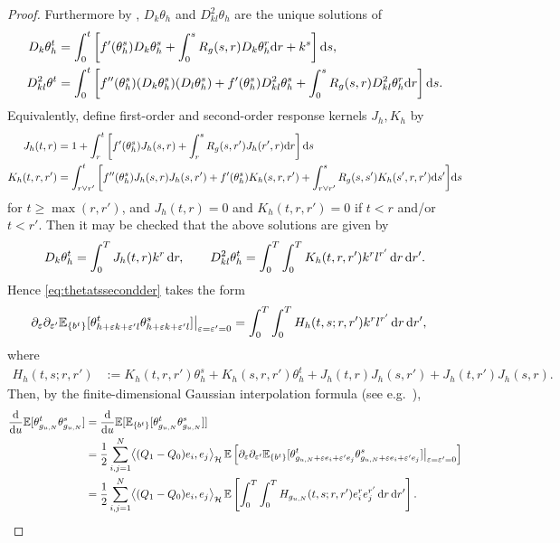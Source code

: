 \begin{proof}
Furthermore by \cite[Theorem 2.5]{wang2017stochastic}, $D_k\theta_h$ and
$D_{kl}^2\theta_h$ are the unique solutions of
\begin{align*}
    D_k\theta_h^t
    &=
    \int_0^t
    \left[
        f'(\theta_h^s)D_k\theta_h^s
        +
        \int_0^s R_g(s,r) D_k\theta_h^r \mathrm{d} r
        +
        k^s
    \right]
    \mathrm{d} s,\\
    D_{kl}^2\theta^t
    &=
    \int_0^t
    \left[
        f''(\theta_h^s)
        (D_k\theta_h^s)(D_l\theta_h^s)
        +f'(\theta_h^s)D_{kl}^2 \theta_h^s
        + \int_0^s R_g(s,r) D_{kl}^2\theta_h^r \mathrm{d} r
    \right]
    \mathrm{d} s.
\end{align*}
Equivalently, define first-order and second-order response kernels $J_h,K_h$ by
\begin{align*}
    J_h(t,r)
    &=
    1
    +
    \int_r^t
    \left[
        f'(\theta_h^s)J_h(s,r)
        +
        \int_r^s R_g(s,r')J_h(r',r)\mathrm{d} r
    \right]
    \mathrm{d} s\\
    K_h(t,r,r')
    &=
    \int_{r \vee r'}^t
    \bigg[
        f''(\theta_h^s)J_h(s,r)J_h(s,r')
        +
        f'(\theta_h^s)K_h(s,r,r')
        +
        \int_{r \vee r'}^s R_g(s,s') K_h(s',r,r') \mathrm{d} s' 
    \bigg]
    \mathrm{d} s
\end{align*}
for $t \geq \max(r,r')$, and $J_h(t,r)=0$ and $K_h(t,r,r')=0$ if $t<r$ and/or
$t<r'$. Then it may be checked that the above solutions are given by
\begin{equation}\label{eq:second-deriv-representation}
D_k\theta_h^t=\int_0^T J_h(t,r) k^r\,\mathrm{d} r,
\qquad
D_{kl}^2\theta_h^t=\int_0^T \int_0^T K_h(t,r,r')k^r l^{r'}\,\mathrm{d} r\,\mathrm{d} r'.
\end{equation}
Hence \eqref{eq:thetatssecondder} takes the form
\begin{align*}
\partial_\varepsilon\partial_{\varepsilon'}
\mathbb{E}_{\{b^t\}}[\theta_{h+\varepsilon k+\varepsilon'l}^t
\theta_{h+\varepsilon k+\varepsilon'l}^s]\big|_{\varepsilon=\varepsilon'=0}
&=\int_0^T \int_0^T H_h(t,s;r,r')k^r l^{r'}\,\mathrm{d} r\,\mathrm{d} r',
\end{align*}
where
\begin{align*}
    H_h(t,s;r,r')
    &:=
    K_h(t,r,r')\theta_h^s
    +
    K_h(s,r,r')\theta_h^t
    +
    J_h(t,r)J_h(s,r')
    +
    J_h(t,r')J_h(s,r).
\end{align*}
Then, by the finite-dimensional Gaussian interpolation formula
(see e.g.\ \cite[Lemma 7.2.7]{vershynin2018high}),
\begin{align}
    \frac{\mathrm{d}}{\mathrm{d} u}\mathbb{E}[\theta_{g_{u,N}}^t\theta_{g_{u,N}}^s]
&=\frac{\mathrm{d}}{\mathrm{d} u}\mathbb{E}[\mathbb{E}_{\{b^t\}}[\theta_{g_{u,N}}^t\theta_{g_{u,N}}^s]]\notag\\
    &=
    \frac12
    \sum_{i,j=1}^N
    \bigl\langle (Q_1-Q_0)e_i,e_j\bigr\rangle_{\mathcal{H}}
    \,
    \mathbb{E}
\left[\partial_\varepsilon\partial_{\varepsilon'}
\mathbb{E}_{\{b^t\}}[\theta_{g_{u,N}+\varepsilon e_i+\varepsilon'e_j}^t
\theta_{g_{u,N}+\varepsilon e_i+\varepsilon'e_j}^s]\big|_{\varepsilon=\varepsilon'=0}\right]
    \notag\\
    &=
    \frac12
    \sum_{i,j=1}^N
    \bigl\langle (Q_1-Q_0)e_i,e_j\bigr\rangle_{\mathcal{H}}
    \,
    \mathbb{E}\left[
        \int_0^T\int_0^T
        H_{g_{u,N}}(t,s;r,r')
        e_i^re_j^{r'}
        \,\mathrm{d} r\,\mathrm{d} r'
    \right].\label{eq:duCg}
\end{align}


\end{proof}

